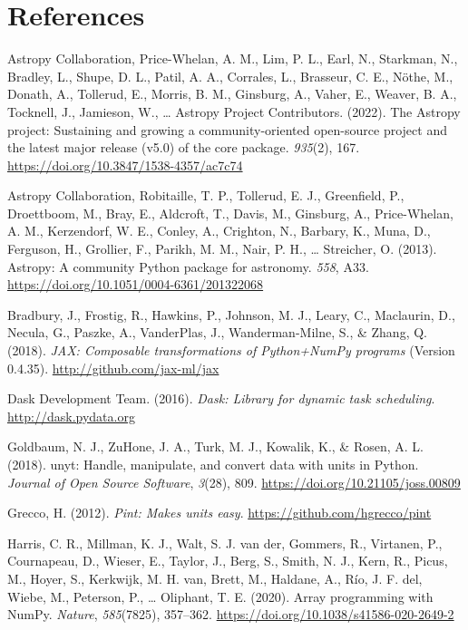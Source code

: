 \documentclass[
]{article}
\newlength{\cslhangindent}
\newenvironment{CSLReferences}[2] %
 {\begin{list}{}{%
  \setlength{\itemindent}{0pt}
  \setlength{\leftmargin}{0pt}
  \setlength{\parsep}{0pt}
  \ifodd #1
   \setlength{\leftmargin}{\cslhangindent}
   \setlength{\itemindent}{-1\cslhangindent}
  \fi
  \setlength{\itemsep}{#2\baselineskip}}}
 {\end{list}}
\begin{document}
\section*{References}\label{references}

\protect{}\label{refs}
\begin{CSLReferences}{1}{0}
Astropy Collaboration, Price-Whelan, A. M., Lim, P. L., Earl, N.,
Starkman, N., Bradley, L., Shupe, D. L., Patil, A. A., Corrales, L.,
Brasseur, C. E., Nöthe, M., Donath, A., Tollerud, E., Morris, B. M.,
Ginsburg, A., Vaher, E., Weaver, B. A., Tocknell, J., Jamieson, W.,
\ldots{} Astropy Project Contributors. (2022). The {A}stropy project:
Sustaining and growing a community-oriented open-source project and the
latest major release (v5.0) of the core package. \emph{935}(2), 167.
\url{https://doi.org/10.3847/1538-4357/ac7c74}

Astropy Collaboration, Robitaille, T. P., Tollerud, E. J., Greenfield,
P., Droettboom, M., Bray, E., Aldcroft, T., Davis, M., Ginsburg, A.,
Price-Whelan, A. M., Kerzendorf, W. E., Conley, A., Crighton, N.,
Barbary, K., Muna, D., Ferguson, H., Grollier, F., Parikh, M. M., Nair,
P. H., \ldots{} Streicher, O. (2013). Astropy: A community {P}ython
package for astronomy. \emph{558}, A33.
\url{https://doi.org/10.1051/0004-6361/201322068}

Bradbury, J., Frostig, R., Hawkins, P., Johnson, M. J., Leary, C.,
Maclaurin, D., Necula, G., Paszke, A., VanderPlas, J., Wanderman-Milne,
S., \& Zhang, Q. (2018). \emph{{JAX}: Composable transformations of
{Python}+{NumPy} programs} (Version 0.4.35).
\url{http://github.com/jax-ml/jax}

Dask Development Team. (2016). \emph{Dask: Library for dynamic task
scheduling}. \url{http://dask.pydata.org}

Goldbaum, N. J., ZuHone, J. A., Turk, M. J., Kowalik, K., \& Rosen, A.
L. (2018). {u}nyt: Handle, manipulate, and convert data with units in
{P}ython. \emph{Journal of Open Source Software}, \emph{3}(28), 809.
\url{https://doi.org/10.21105/joss.00809}

Grecco, H. (2012). \emph{Pint: Makes units easy}.
\url{https://github.com/hgrecco/pint}

Harris, C. R., Millman, K. J., Walt, S. J. van der, Gommers, R.,
Virtanen, P., Cournapeau, D., Wieser, E., Taylor, J., Berg, S., Smith,
N. J., Kern, R., Picus, M., Hoyer, S., Kerkwijk, M. H. van, Brett, M.,
Haldane, A., Río, J. F. del, Wiebe, M., Peterson, P., \ldots{} Oliphant,
T. E. (2020). Array programming with {NumPy}. \emph{Nature},
\emph{585}(7825), 357--362.
\url{https://doi.org/10.1038/s41586-020-2649-2}


\end{CSLReferences}
\end{document}
